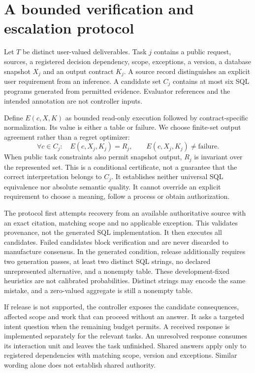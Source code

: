 \documentclass[11pt]{article}
\begin{document}
\section{A bounded verification and escalation protocol}
Let $T$ be distinct user-valued deliverables. Task $j$ contains a public request, sources, a registered decision dependency, scope, exceptions, a version, a database snapshot $X_j$ and an output contract $K_j$. A source record distinguishes an explicit user requirement from an inference. A candidate set $C_j$ contains at most six SQL programs generated from permitted evidence. Evaluator references and the intended annotation are not controller inputs.

Define $E(c,X,K)$ as bounded read-only execution followed by contract-specific normalization. Its value is either a table or failure. We choose finite-set output agreement rather than a regret optimizer:
\begin{equation}
 \forall c\in C_j:\quad E(c,X_j,K_j)=R_j, \qquad E(c,X_j,K_j)\ne\mathrm{failure}.
 \label{eq:certificate}
\end{equation}
When public task constraints also permit snapshot output, $R_j$ is invariant over the represented set. This is a conditional certificate, not a guarantee that the correct interpretation belongs to $C_j$. It establishes neither universal SQL equivalence nor absolute semantic quality. It cannot override an explicit requirement to choose a meaning, follow a process or obtain authorization.

The protocol first attempts recovery from an available authoritative source with an exact citation, matching scope and no applicable exception. This validates provenance, not the generated SQL implementation. It then executes all candidates. Failed candidates block verification and are never discarded to manufacture consensus. In the generated condition, release additionally requires two generation passes, at least two distinct SQL strings, no declared unrepresented alternative, and a nonempty table. These development-fixed heuristics are not calibrated probabilities. Distinct strings may encode the same mistake, and a zero-valued aggregate is still a nonempty table.

If release is not supported, the controller exposes the candidate consequences, affected scope and work that can proceed without an answer. It asks a targeted intent question when the remaining budget permits. A received response is implemented separately for the relevant tasks. An unresolved response consumes its interaction unit and leaves the task unfinished. Shared answers apply only to registered dependencies with matching scope, version and exceptions. Similar wording alone does not establish shared authority.
\end{document}
